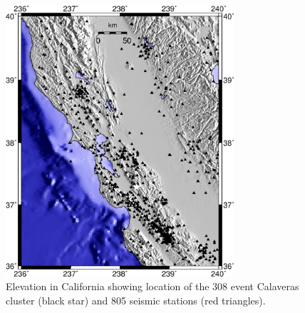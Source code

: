 \documentclass[extra]{gji}
\begin{document}
\begin{figure}
\noindent\includegraphics[width = 20pc]{diags/CalaverasMap/gmt_california/CaliforniaCalaverasMap1.eps}
\caption{Elevation in California showing location
of the 308 event Calaveras cluster (black star) and 805 seismic stations (red triangles).}
\label{fig:-eqopti-California-Calaveras}
\end{figure}
\end{document}
